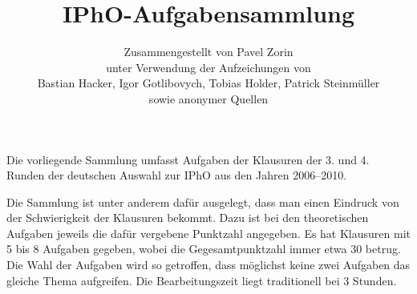 \def \envfinal {}



\newcommand{\skizze}[1]{
\begin{center}
#1
\end{center}
}

%
%
%
\renewcommand{\thesubsection}{\arabic{subsection}}
\def\solTitle<#1><#2>{
\renewcommand{\thesubsection}{#1}
\subsection{#2}
\renewcommand{\thesubsection}{\arabic{subsection}}
}

\newenvironment{problem}[2]{
\subsection{#1 \emph{(#2 Punkte)}}
\renewcommand{\Currentlabel}{<\thesubsection><#1>}
}{}
\renewenvironment{Soln}[1]{
\solTitle #1
}{}

\title{IPhO-Aufgabensammlung}
\author{Zusammengestellt von Pavel Zorin\\
unter Verwendung der Aufzeichungen von\\
Bastian Hacker, Igor Gotlibovych, Tobias Holder, Patrick Steinmüller\\
sowie anonymer Quellen}


\maketitle

Die vorliegende Sammlung umfasst Aufgaben der Klausuren der 3. und 4. Runden der deutschen Auswahl zur IPhO aus den Jahren 2006--2010.

Die Sammlung ist unter anderem dafür ausgelegt, dass man einen Eindruck von der Schwierigkeit der Klausuren bekommt. Dazu ist bei den theoretischen Aufgaben jeweils die dafür vergebene Punktzahl angegeben. Es hat Klausuren mit 5 bis 8 Aufgaben gegeben, wobei die Gegesamtpunktzahl immer etwa 30 betrug. Die Wahl der Aufgaben wird so getroffen, dass möglichst keine zwei Aufgaben das gleiche Thema aufgreifen. Die Bearbeitungszeit liegt traditionell bei 3 Stunden.

